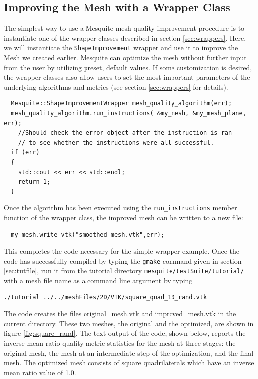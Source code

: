 \subsection{Improving the Mesh with a Wrapper Class}
\label{sec:tutWrapper}
The simplest way to use a Mesquite mesh quality improvement
procedure is to instantiate one of the wrapper classes described in section
\ref{sec:wrappers}. Here, we will instantiate the
\texttt{ShapeImprovement} wrapper and use it to improve 
the Mesh we created earlier.  Mesquite can optimize the mesh
without further input from the user by utilizing preset, default
values.  If some customization is desired, the wrapper classes also
allow users to set the most important parameters of the underlying
algorithms and metrics (see section
\ref{sec:wrappers} for details).
\begin{verbatim}
  Mesquite::ShapeImprovementWrapper mesh_quality_algorithm(err);
  mesh_quality_algorithm.run_instructions( &my_mesh, &my_mesh_plane, err);
    //Should check the error object after the instruction is ran
    // to see whether the instructions were all successful.
  if (err) 
  {
    std::cout << err << std::endl;
    return 1;
  }

\end{verbatim}
Once the algorithm has been executed using the {\tt run\_instructions} member
function of the wrapper class, the improved mesh can be written to a new
file:
\begin{verbatim}
  my_mesh.write_vtk("smoothed_mesh.vtk",err); 
\end{verbatim}
This completes the code necessary for the simple wrapper example.  Once
the code has successfully compiled by typing the {\tt gmake} command given in
section \ref{sec:tutfile}, 
run it from the tutorial directory \texttt{mesquite/testSuite/tutorial/}
with a mesh file name as a command line 
argument by typing 
\begin{verbatim}
./tutorial ../../meshFiles/2D/VTK/square_quad_10_rand.vtk
\end{verbatim}
The code creates the files original\_mesh.vtk
and improved\_mesh.vtk in the current directory.  These two meshes, the
original and the optimized, are
shown in figure \ref{fig:square_rand}.  The text output of the code,
shown below, reports the inverse mean ratio quality metric statistics for
the mesh at three stages:  the original mesh, the mesh at an intermediate
step of the optimization, and the final mesh.  The optimized mesh consists
of square quadrilaterals which have an inverse mean ratio value of 1.0.
